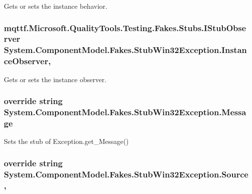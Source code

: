 Gets or sets the instance behavior.

\hypertarget{class_system_1_1_component_model_1_1_fakes_1_1_stub_win32_exception_a3b94d6ed0da1448a19518593aba258ef}{
\subsubsection[{Instance\-Observer}]{\setlength{\rightskip}{0pt plus 5cm}mqttf.\-Microsoft.\-Quality\-Tools.\-Testing.\-Fakes.\-Stubs.\-I\-Stub\-Observer System.\-Component\-Model.\-Fakes.\-Stub\-Win32\-Exception.\-Instance\-Observer\hspace{0.3cm}{\ttfamily [get]}, {\ttfamily [set]}}}\label{class_system_1_1_component_model_1_1_fakes_1_1_stub_win32_exception_a3b94d6ed0da1448a19518593aba258ef}


Gets or sets the instance observer.

\hypertarget{class_system_1_1_component_model_1_1_fakes_1_1_stub_win32_exception_ae3f2cc46b1f0b266d31a6f795900bd4e}{
\subsubsection[{Message}]{\setlength{\rightskip}{0pt plus 5cm}override string System.\-Component\-Model.\-Fakes.\-Stub\-Win32\-Exception.\-Message\hspace{0.3cm}{\ttfamily [get]}}}\label{class_system_1_1_component_model_1_1_fakes_1_1_stub_win32_exception_ae3f2cc46b1f0b266d31a6f795900bd4e}


Sets the stub of Exception.\-get\-\_\-\-Message()

\hypertarget{class_system_1_1_component_model_1_1_fakes_1_1_stub_win32_exception_a1d58a0bf5a4960b001540de55b6795e2}{
\subsubsection[{Source}]{\setlength{\rightskip}{0pt plus 5cm}override string System.\-Component\-Model.\-Fakes.\-Stub\-Win32\-Exception.\-Source\hspace{0.3cm}{\ttfamily [get]}, {\ttfamily [set]}}}\label{class_system_1_1_component_model_1_1_fakes_1_1_stub_win32_exception_a1d58a0bf5a4960b001540de55b6795e2}


